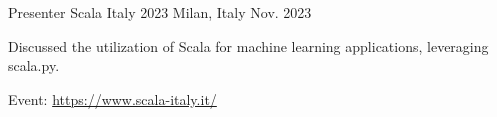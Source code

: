 
\begin{cventries}

  \cventry
    {Presenter} %
    {Scala Italy 2023} %
    {Milan, Italy} %
    {Nov. 2023} %
    {
      \begin{cvitems} %
        \item {Discussed the utilization of Scala for machine learning applications, leveraging scala.py.}
        \item {Event: \url{https://www.scala-italy.it/}}
      \end{cvitems}
    }
\end{cventries}
